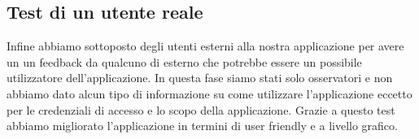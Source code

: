 \documentclass{report}
\begin{document}
\subsection{Test di un utente reale}
Infine abbiamo sottoposto degli utenti esterni alla nostra applicazione per avere un
un feedback da qualcuno di esterno che potrebbe essere un possibile utilizzatore
dell'applicazione.
In questa fase siamo stati solo osservatori e non abbiamo dato alcun tipo di informazione
su come utilizzare l'applicazione eccetto per le credenziali di accesso e lo scopo
della applicazione.
Grazie a questo test abbiamo migliorato l'applicazione in termini di user friendly
e a livello grafico.
\end{document}
